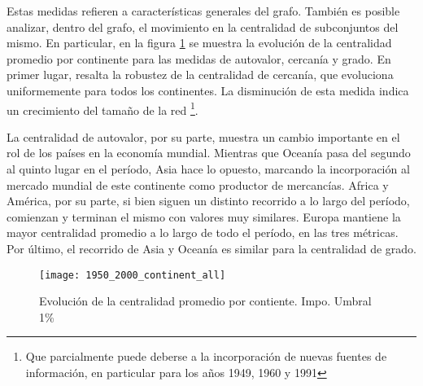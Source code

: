 \documentclass[class=article, crop=false]{standalone}
\begin{document}
Estas medidas refieren a características generales del grafo. También es posible analizar, dentro del grafo, el movimiento en la centralidad de subconjuntos del mismo. En particular, en la figura  \ref{fig:centralidad_LP} se muestra la evolución de la centralidad promedio por continente para las medidas de autovalor, cercanía y grado. En primer lugar, resalta la robustez de la centralidad de cercanía, que evoluciona uniformemente para todos los continentes. La disminución de esta medida indica un crecimiento del tamaño de la red \footnote{ Que parcialmente puede deberse a la incorporación de nuevas fuentes de información, en particular para los años 1949, 1960 y 1991}. \par
La centralidad de autovalor, por su parte, muestra un cambio importante en el rol de los países en la economía mundial. Mientras que Oceanía pasa del segundo al quinto lugar en el período, Asia hace lo opuesto, marcando la incorporación al mercado mundial de este continente como productor de mercancías.  Africa y América, por su parte, si bien siguen un distinto recorrido a lo largo del período, comienzan y terminan el mismo con valores muy similares. Europa mantiene la mayor centralidad promedio a lo largo de todo el período, en las tres métricas. Por último, el recorrido de Asia y Oceanía es similar para la centralidad de grado.

\begin{figure}[h!]
	\centering		\texttt{[image: 1950\_2000\_continent\_all]}
	\caption{Evolución de la centralidad promedio por contiente. Impo. Umbral 1\%}
	\label{fig:centralidad_LP}
\end{figure}
\end{document}
